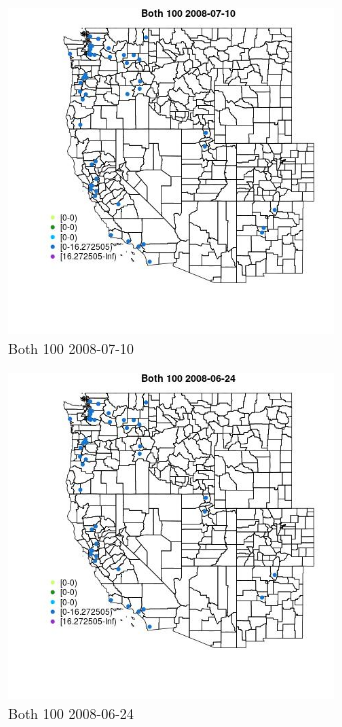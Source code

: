 \begin{figure} 
\centering  
\includegraphics[width=0.77\textwidth]{Code_Outputs/Report_ML_input_PM25_Step4_part_e_de_duplicated_aves_MapObsBoth_1002008-07-10.jpg} 
\caption{\label{fig:Report_ML_input_PM25_Step4_part_e_de_duplicated_avesMapObsBoth_1002008-07-10}Both 100 2008-07-10} 
\end{figure} 
 

\clearpage 

\begin{figure} 
\centering  
\includegraphics[width=0.77\textwidth]{Code_Outputs/Report_ML_input_PM25_Step4_part_e_de_duplicated_aves_MapObsBoth_1002008-06-24.jpg} 
\caption{\label{fig:Report_ML_input_PM25_Step4_part_e_de_duplicated_avesMapObsBoth_1002008-06-24}Both 100 2008-06-24} 
\end{figure} 
 

